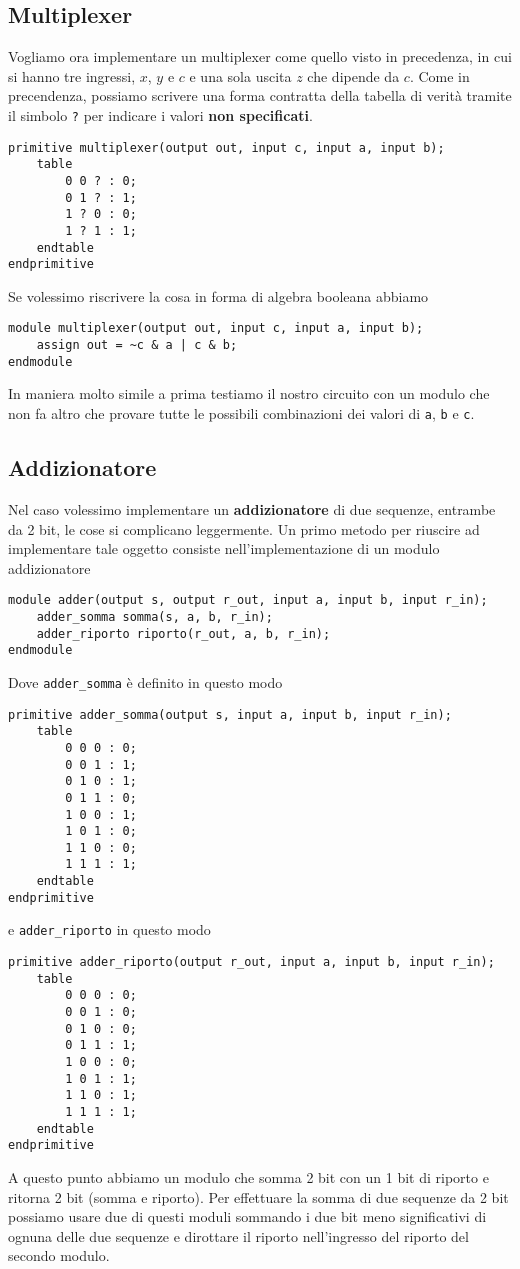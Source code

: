 \subsection{Multiplexer}
Vogliamo ora implementare un multiplexer come quello visto in precedenza, in cui si hanno tre
ingressi, $x$, $y$ e $c$ e una sola uscita $z$ che dipende da $c$. Come in precendenza, possiamo
scrivere una forma contratta della tabella di verità tramite il simbolo \verb|?| per indicare i
valori \textbf{non specificati}.
\begin{verbatim}
primitive multiplexer(output out, input c, input a, input b);
	table
		0 0 ? : 0;
		0 1 ? : 1;
		1 ? 0 : 0;
		1 ? 1 : 1;
	endtable
endprimitive
\end{verbatim}
Se volessimo riscrivere la cosa in forma di algebra booleana abbiamo
\begin{verbatim}
module multiplexer(output out, input c, input a, input b);
	assign out = ~c & a | c & b;
endmodule
\end{verbatim}
In maniera molto simile a prima testiamo il nostro circuito con un modulo che non fa altro che
provare tutte le possibili combinazioni dei valori di \verb|a|, \verb|b| e \verb|c|.

\subsection{Addizionatore}
Nel caso volessimo implementare un \textbf{addizionatore} di due sequenze, entrambe da 2 bit, le
cose si complicano leggermente. Un primo metodo per riuscire ad implementare tale oggetto consiste
nell'implementazione di un modulo addizionatore
\begin{verbatim}
module adder(output s, output r_out, input a, input b, input r_in);
	adder_somma somma(s, a, b, r_in);
	adder_riporto riporto(r_out, a, b, r_in);
endmodule
\end{verbatim}
Dove \verb|adder_somma| è definito in questo modo
\begin{verbatim}
primitive adder_somma(output s, input a, input b, input r_in);
	table
		0 0 0 : 0;
		0 0 1 : 1;
		0 1 0 : 1;
		0 1 1 : 0;
		1 0 0 : 1;
		1 0 1 : 0;
		1 1 0 : 0;
		1 1 1 : 1;
	endtable
endprimitive
\end{verbatim}
e \verb|adder_riporto| in questo modo
\begin{verbatim}
primitive adder_riporto(output r_out, input a, input b, input r_in);
	table
		0 0 0 : 0;
		0 0 1 : 0;
		0 1 0 : 0;
		0 1 1 : 1;
		1 0 0 : 0;
		1 0 1 : 1;
		1 1 0 : 1;
		1 1 1 : 1;
	endtable
endprimitive
\end{verbatim}
A questo punto abbiamo un modulo che somma 2 bit con un 1 bit di riporto e ritorna 2 bit (somma e
riporto). Per effettuare la somma di due sequenze da 2 bit possiamo usare due di questi moduli
sommando i due bit meno significativi di ognuna delle due sequenze e dirottare il riporto
nell'ingresso del riporto del secondo modulo.
\begin{verbatim}

\end{verbatim}